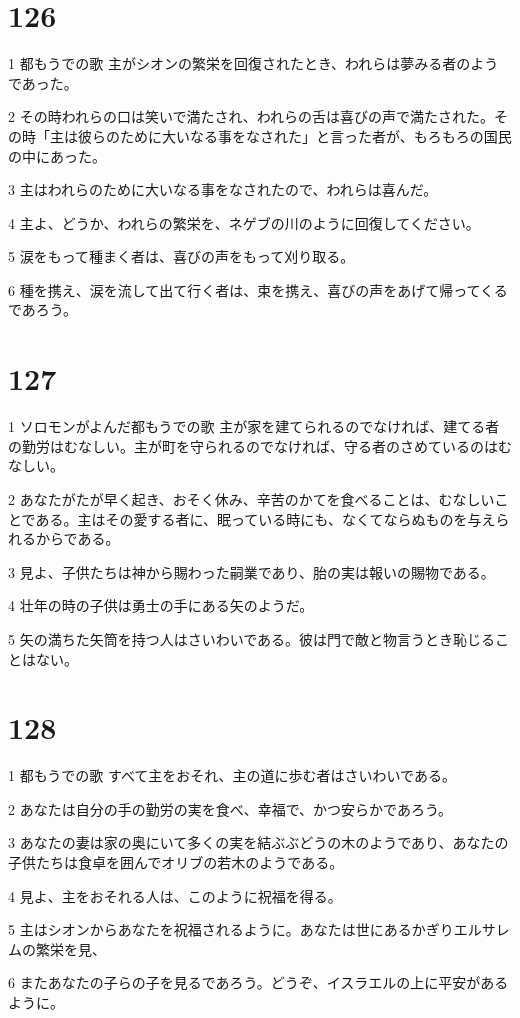 \chapter{126}

\par 1 都もうでの歌 主がシオンの繁栄を回復されたとき、われらは夢みる者のようであった。
\par 2 その時われらの口は笑いで満たされ、われらの舌は喜びの声で満たされた。その時「主は彼らのために大いなる事をなされた」と言った者が、もろもろの国民の中にあった。
\par 3 主はわれらのために大いなる事をなされたので、われらは喜んだ。
\par 4 主よ、どうか、われらの繁栄を、ネゲブの川のように回復してください。
\par 5 涙をもって種まく者は、喜びの声をもって刈り取る。
\par 6 種を携え、涙を流して出て行く者は、束を携え、喜びの声をあげて帰ってくるであろう。

\chapter{127}

\par 1 ソロモンがよんだ都もうでの歌 主が家を建てられるのでなければ、建てる者の勤労はむなしい。主が町を守られるのでなければ、守る者のさめているのはむなしい。
\par 2 あなたがたが早く起き、おそく休み、辛苦のかてを食べることは、むなしいことである。主はその愛する者に、眠っている時にも、なくてならぬものを与えられるからである。
\par 3 見よ、子供たちは神から賜わった嗣業であり、胎の実は報いの賜物である。
\par 4 壮年の時の子供は勇士の手にある矢のようだ。
\par 5 矢の満ちた矢筒を持つ人はさいわいである。彼は門で敵と物言うとき恥じることはない。

\chapter{128}

\par 1 都もうでの歌 すべて主をおそれ、主の道に歩む者はさいわいである。
\par 2 あなたは自分の手の勤労の実を食べ、幸福で、かつ安らかであろう。
\par 3 あなたの妻は家の奥にいて多くの実を結ぶぶどうの木のようであり、あなたの子供たちは食卓を囲んでオリブの若木のようである。
\par 4 見よ、主をおそれる人は、このように祝福を得る。
\par 5 主はシオンからあなたを祝福されるように。あなたは世にあるかぎりエルサレムの繁栄を見、
\par 6 またあなたの子らの子を見るであろう。どうぞ、イスラエルの上に平安があるように。

